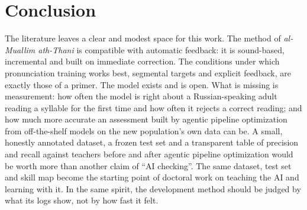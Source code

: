 \documentclass[a4paper,14pt]{extarticle}
\begin{document}
\section{Conclusion}

The literature leaves a clear and modest space for this work. The method of \emph{al-Muallim ath-Thani} is
compatible with automatic feedback: it is sound-based, incremental and built on immediate correction.
The conditions under which pronunciation training works best, segmental targets and explicit feedback,
are exactly those of a primer. The model exists and is open. What is missing is measurement: how often the
model is right about a Russian-speaking adult reading a syllable for the first time and how often it rejects
a correct reading; and how much more accurate an assessment built by agentic pipeline optimization from off-the-shelf models on the new population's own data can be. A small, honestly annotated dataset, a frozen test set and a transparent table of
precision and recall against teachers before and after agentic pipeline optimization would be worth more than another claim
of ``AI checking''. The same dataset, test set and skill map become the starting point of doctoral work on
teaching the AI and learning with it. In the same spirit, the development method should be judged by what its logs show, not
by how fast it felt.

\printbibliography[heading=bibintoc,title={References}]
\end{document}
